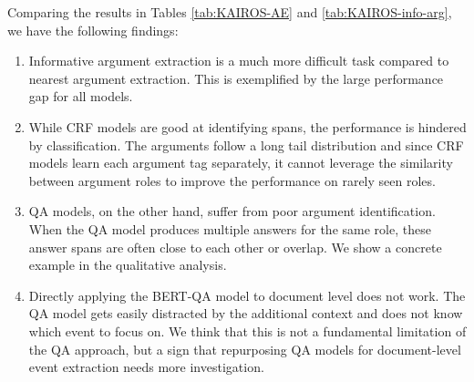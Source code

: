\begin{table}[t]
    \centering
    \small
    \caption{Informative argument extraction results on \textsc{WikiEvents} test set. }
    \label{tab:KAIROS-info-arg}
\end{table}

Comparing the results in Tables \ref{tab:KAIROS-AE} and \ref{tab:KAIROS-info-arg}, we have the following findings:
\begin{enumerate}
    \item Informative argument extraction is a much more difficult task compared to nearest argument extraction. This is exemplified by the large performance gap for all models.
    \item While CRF models are good at identifying spans, the  performance is hindered by classification. The arguments follow a long tail distribution and since CRF models learn each argument tag separately, it cannot leverage the similarity between argument roles to improve the performance on rarely seen roles. 
    \item QA models, on the other hand, suffer from poor argument identification. When the QA model produces multiple answers for the same role, these answer spans are often close to each other or overlap. We show a concrete example in the qualitative analysis. 
    \item Directly applying the BERT-QA model to document level does not work. The QA model gets easily distracted by the additional context and does not know which event to focus on. We think that this is not a fundamental limitation of the QA approach, but a sign that repurposing QA models for document-level event extraction needs more investigation.
\end{enumerate}


